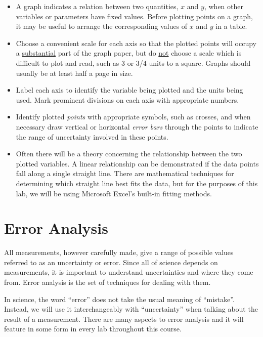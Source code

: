 \begin{itemize}
    \item A graph indicates a relation between two quantities, $x$ and $y$, when other variables or parameters have fixed values.  Before plotting points on a graph, it may be useful to arrange the corresponding values of $x$ and $y$ in a table.

    \item Choose a convenient scale for each axis so that the plotted points will occupy a \underline{substantial} part of the graph paper, but do \underline{not} choose a scale which is difficult to plot and read, such as 3 or 3/4 units to a square.  Graphs should usually be at least half a page in size.

    \item Label each axis to identify the variable being plotted and the units being used.  Mark prominent divisions on each axis with appropriate numbers.

    \item Identify plotted \emph{points} with appropriate symbols, such as crosses, and when necessary draw vertical or horizontal \emph{error bars} through the points to indicate the range of uncertainty involved in these points.

    \item Often there will be a theory concerning the relationship between the two plotted variables.  A linear relationship can be demonstrated if the data points fall along a single straight line.  There are mathematical techniques for determining which straight line best fits the data, but for the purposes of this lab, we will be using Microsoft Excel's built-in fitting methods.
\end{itemize}

\section{Error Analysis}

All measurements, however carefully made, give a range of possible values referred to as an uncertainty or error. Since all of science depends on measurements, it is important to understand uncertainties and where they come from. Error analysis is the set of techniques for dealing with them.\myskip

In science, the word ``error'' does not take the usual meaning of ``mistake''. Instead, we will use it interchangeably with ``uncertainty'' when talking about the result of a measurement. There are many aspects to error analysis and it will feature in some form in every lab throughout this course.

